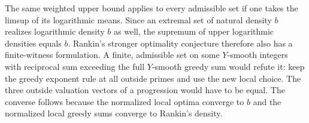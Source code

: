 The same weighted upper bound applies to every admissible set if one takes the limsup of its logarithmic means. Since an extremal set of natural density $b$ realizes logarithmic density $b$ as well, the supremum of upper logarithmic densities equals $b$. Rankin's stronger optimality conjecture therefore also has a finite-witness formulation. A finite, admissible set on some $Y$-smooth integers with reciprocal sum exceeding the full $Y$-smooth greedy sum would refute it: keep the greedy exponent rule at all outside primes and use the new local choice. The three outside valuation vectors of a progression would have to be equal. The converse follows because the normalized local optima converge to $b$ and the normalized local greedy sums converge to Rankin's density.
